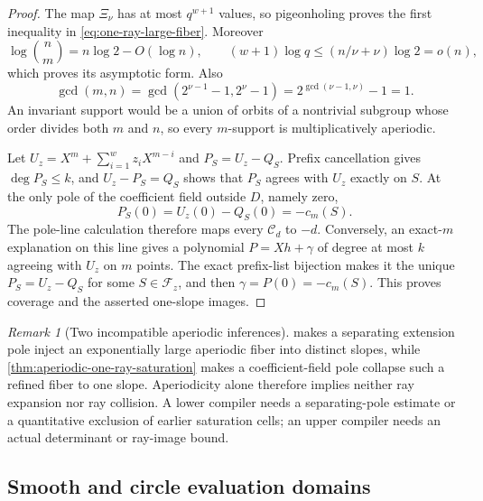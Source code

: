 \documentclass[11pt,a4paper]{amsart}
\numberwithin{equation}{section}
\theoremstyle{remark}
\newtheorem{remark}[remark]{Remark}
\newcommand{\Ccal}{\mathcal C}
\newcommand{\Fcal}{\mathcal F}
\begin{document}
\begin{proof}
The map \(\Xi_\nu\) has at most \(q^{w+1}\) values, so pigeonholing
proves the first inequality in \eqref{eq:one-ray-large-fiber}.  Moreover
\[
 \log\binom nm=n\log2-O(\log n),\qquad
 (w+1)\log q\le(n/\nu+\nu)\log2=o(n),
\]
which proves its asymptotic form.  Also
\[
 \gcd(m,n)=\gcd(2^{\nu-1}-1,2^\nu-1)
           =2^{\gcd(\nu-1,\nu)}-1=1.
\]
An invariant support would be a union of orbits of a nontrivial subgroup
whose order divides both \(m\) and \(n\), so every \(m\)-support is
multiplicatively aperiodic.

Let \(U_z=X^m+\sum_{i=1}^wz_iX^{m-i}\) and
\(P_S=U_z-Q_S\).  Prefix cancellation gives \(\deg P_S\le k\), and
\(U_z-P_S=Q_S\) shows that \(P_S\) agrees with \(U_z\) exactly on \(S\).
At the only pole of the coefficient field outside \(D\), namely zero,
\[
                     P_S(0)=U_z(0)-Q_S(0)=-c_m(S).
\]
The pole-line calculation therefore maps every \(\Ccal_d\) to \(-d\).
Conversely, an exact-\(m\) explanation on this line gives a polynomial
\(P=Xh+\gamma\) of degree at most \(k\) agreeing with \(U_z\) on
\(m\) points.  The exact prefix-list bijection makes it the unique
\(P_S=U_z-Q_S\) for some \(S\in\Fcal_z\), and then
\(\gamma=P(0)=-c_m(S)\).  This proves coverage and the asserted
one-slope images.
\end{proof}

\begin{remark}[Two incompatible aperiodic inferences]
\label{rem:two-aperiodic-ray-extremes}
 makes a separating extension pole
inject an exponentially large aperiodic fiber into distinct slopes, while
\cref{thm:aperiodic-one-ray-saturation} makes a coefficient-field pole collapse
such a refined fiber to one slope.  Aperiodicity alone therefore implies
neither ray expansion nor ray collision.  A lower compiler needs a
separating-pole estimate or a quantitative exclusion of earlier saturation
cells; an upper compiler needs an actual determinant or ray-image bound.
\end{remark}

\subsection{Smooth and circle evaluation domains}\label{sec:smooth-circle-domains}
\end{document}

